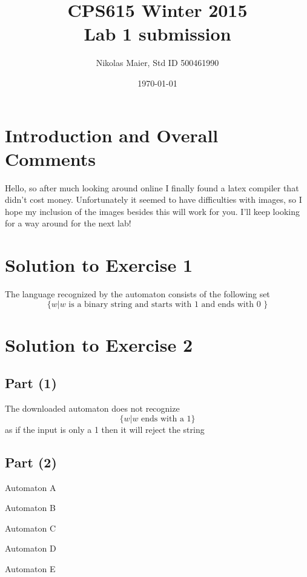 \documentclass[11pt, fleqn]{article}
\title{CPS615 Winter 2015\\Lab 1 submission}
\author{Nikolas Maier, Std ID 500461990}
\date{\today}
\begin{document}
\maketitle
\section{Introduction and Overall Comments}
Hello, so after much looking around online I finally found a latex compiler that didn't cost money. Unfortunately it seemed to have difficulties with images, so I hope my inclusion of the images besides this will work for you. 
I'll keep looking for a way around for the next lab!

\section*{Solution to Exercise 1}

The language recognized by the automaton consists of the following set 
\[
\{w|w \mbox{ is a binary string and starts with 1 and ends with 0 }\}
\]

\section*{Solution to Exercise 2}

\subsection*{Part (1)}
The downloaded automaton does not recognize 
\[
\{w|w \mbox{ ends with a 1}\}
\]
as if the input is only a 1 then it will reject the string

\subsection*{Part (2)}
Automaton A 

Automaton B 

Automaton C

Automaton D

Automaton E
\end{document}

